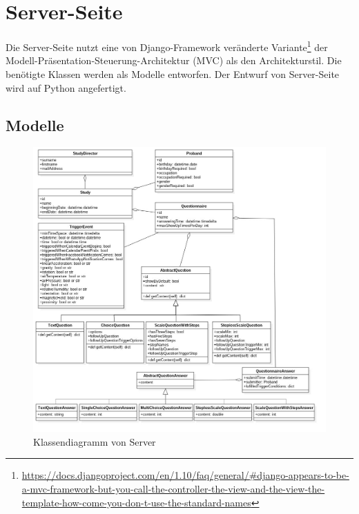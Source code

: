 \documentclass[a4paper]{scrreprt}
\begin{document}
{    \chapter{Server-Seite}
        Die Server-Seite nutzt eine von Django-Framework veränderte Variante\footnote{\href{https://docs.djangoproject.com/en/1.10/faq/general/\#django-appears-to-be-a-mvc-framework-but-you-call-the-controller-the-view-and-the-view-the-template-how-come-you-don-t-use-the-standard-names}{https://docs.djangoproject.com/en/1.10/faq/general/\#django-appears-to-be-a-mvc-framework-but-you-call-the-controller-the-view-and-the-view-the-template-how-come-you-don-t-use-the-standard-names}} der Modell-Präsentation-Steuerung-Architektur (MVC) als den Architekturstil. Die benötigte Klassen werden als Modelle entworfen. Der Entwurf von Server-Seite wird auf Python angefertigt.

        \section{Modelle}
                	\begin{figure}[H]
                                \centering
                                \includegraphics[scale = 1]{ClassDiagramServer.jpg}
                                \caption{Klassendiagramm von Server}
                	 \end{figure}
                	 
}
\end{document}
